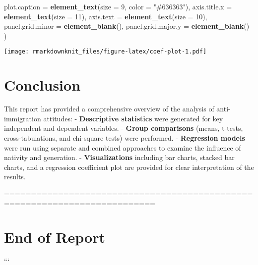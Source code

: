 \documentclass[
]{article}
\newenvironment{Shaded}{\begin{snugshade}}{\end{snugshade}}
\newcommand{\AttributeTok}[1]{\textcolor[rgb]{0.13,0.29,0.53}{#1}}
\newcommand{\DecValTok}[1]{\textcolor[rgb]{0.00,0.00,0.81}{#1}}
\newcommand{\FunctionTok}[1]{\textcolor[rgb]{0.13,0.29,0.53}{\textbf{#1}}}
\newcommand{\NormalTok}[1]{#1}
\newcommand{\StringTok}[1]{\textcolor[rgb]{0.31,0.60,0.02}{#1}}
\begin{document}
\begin{Shaded}
\begin{Highlighting}[]
    \AttributeTok{plot.caption =} \FunctionTok{element\_text}\NormalTok{(}\AttributeTok{size =} \DecValTok{9}\NormalTok{, }\AttributeTok{color =} \StringTok{"\#636363"}\NormalTok{),}
    \AttributeTok{axis.title.x =} \FunctionTok{element\_text}\NormalTok{(}\AttributeTok{size =} \DecValTok{11}\NormalTok{),}
    \AttributeTok{axis.text =} \FunctionTok{element\_text}\NormalTok{(}\AttributeTok{size =} \DecValTok{10}\NormalTok{),}
    \AttributeTok{panel.grid.minor =} \FunctionTok{element\_blank}\NormalTok{(),}
    \AttributeTok{panel.grid.major.y =} \FunctionTok{element\_blank}\NormalTok{()}
\NormalTok{  )}
\end{Highlighting}
\end{Shaded}

\texttt{[image: rmarkdownknit\_files/figure-latex/coef-plot-1.pdf]}

\section{Conclusion}\label{conclusion}

This report has provided a comprehensive overview of the analysis of
anti-immigration attitudes: - \textbf{Descriptive statistics} were
generated for key independent and dependent variables. - \textbf{Group
comparisons} (means, t-tests, cross-tabulations, and chi-square tests)
were performed. - \textbf{Regression models} were run using separate and
combined approaches to examine the influence of nativity and generation.
- \textbf{Visualizations} including bar charts, stacked bar charts, and
a regression coefficient plot are provided for clear interpretation of
the results.

==========================================================================

\section{End of Report}\label{end-of-report}

```
\end{document}
